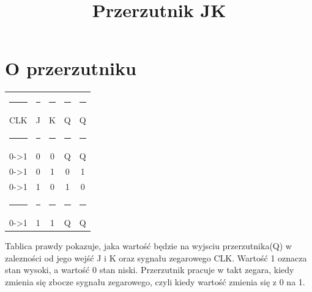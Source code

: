 \documentclass{article}
\title{Przerzutnik JK}
\begin{document}
\maketitle
\section{O przerzutniku}
{\centering
\begin{tabular}{|c|c|c|c|c|}\hline
\rule{10pt}{0pt} & \rule{10pt}{0pt} & \rule{10pt}{0pt} & \rule{10pt}{0pt} & \rule{10pt}{1pt}\\
CLK & J&K&Q&Q\\ \hline
\rule{10pt}{0pt} & \rule{10pt}{0pt} & \rule{10pt}{0pt} & \rule{10pt}{0pt} & \rule{10pt}{1pt}\\
0->1 & 0 & 0 & Q&Q\\  \hline
0->1 & 0 & 1 & 0 &1\\ \hline
0->1 & 1 & 0 & 1 & 0\\ \hline
\rule{10pt}{0pt} & \rule{10pt}{0pt} & \rule{10pt}{0pt} & \rule{10pt}{1pt} & \rule{10pt}{0pt}\\
0->1 & 1 & 1 & Q & Q\\ \hline
\end{tabular}
\par
}
Tablica prawdy pokazuje, jaka wartość będzie na wyjsciu przerzutnika(Q) w zalezności od jego wejść J i K oraz sygnału zegarowego CLK. Wartość 1 oznacza stan wysoki, a wartość 0 stan niski. Przerzutnik pracuje w takt zegara, kiedy zmienia się zbocze sygnału zegarowego, czyli kiedy wartość zmienia się z 0 na 1.
\end{document}
